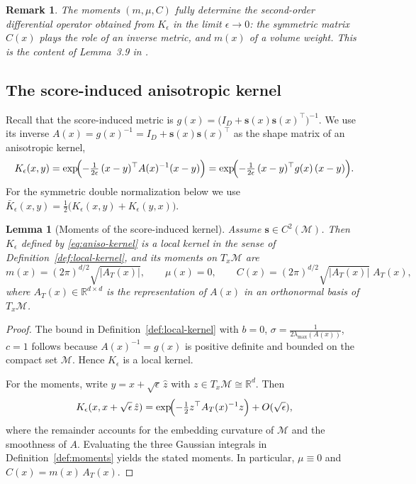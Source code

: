\documentclass{article}
\newcommand{\M}{\mathcal{M}}
\newtheorem{lemma}{Lemma}%
\newtheorem{remark}{Remark}
\begin{document}
\begin{remark}
The moments $(m,\mu,C)$ fully determine the second-order differential operator obtained from $K_\epsilon$ in the limit $\epsilon\to 0$: the symmetric matrix \(C(x)\) plays the role of an inverse metric, and \(m(x)\) of a volume weight. This is the content of Lemma~3.9 in \citep{berry2016local}.
\end{remark}

\subsection{The score-induced anisotropic kernel}

Recall that the score-induced metric is \(g(x)=\bigl(I_D+\mathbf{s}(x)\mathbf{s}(x)^\top\bigr)^{-1}\). We use its inverse \(A(x)=g(x)^{-1}=I_D+\mathbf{s}(x)\mathbf{s}(x)^\top\) as the shape matrix of an anisotropic kernel,
\begin{equation}\label{eq:aniso-kernel}
K_\epsilon(x,y)=\exp\!\Bigl(-\tfrac{1}{2\epsilon}\,(x-y)^\top A(x)^{-1}(x-y)\Bigr)
=\exp\!\Bigl(-\tfrac{1}{2\epsilon}\,(x-y)^\top g(x)\,(x-y)\Bigr).
\end{equation}
For the symmetric double normalization below we use \(\bar K_\epsilon(x,y)=\tfrac{1}{2}\bigl(K_\epsilon(x,y)+K_\epsilon(y,x)\bigr)\).

\begin{lemma}[Moments of the score-induced kernel]\label{lem:moments}
Assume \(\mathbf{s}\in C^2(\M)\). Then \(K_\epsilon\) defined by \eqref{eq:aniso-kernel} is a local kernel in the sense of Definition~\ref{def:local-kernel}, and its moments on \(T_x\M\) are
\[
m(x)=(2\pi)^{d/2}\sqrt{|A_T(x)|},
\qquad
\mu(x)=0,
\qquad
C(x)=(2\pi)^{d/2}\sqrt{|A_T(x)|}\;A_T(x),
\]
where \(A_T(x)\in\mathbb{R}^{d\times d}\) is the representation of \(A(x)\) in an orthonormal basis of \(T_x\M\).
\end{lemma}

\begin{proof}
The bound in Definition~\ref{def:local-kernel} with \(b = 0\), \(\sigma=\tfrac{1}{2\lambda_{\max}(A(x))}\), \(c=1\) follows because \(A(x)^{-1}=g(x)\) is positive definite and bounded on the compact set \(\M\). Hence \(K_\epsilon\) is a local kernel.

For the moments, write \(y=x+\sqrt\epsilon\,\hat z\) with \(z\in T_x\M\cong\mathbb{R}^d\). Then
\[
K_\epsilon(x,x+\sqrt\epsilon\,\hat z)
=\exp\!\Bigl(-\tfrac{1}{2}z^\top A_T(x)^{-1}z\Bigr)+O(\sqrt\epsilon),
\]
where the remainder accounts for the embedding curvature of \(\M\) and the smoothness of \(A\). Evaluating the three Gaussian integrals in Definition~\ref{def:moments} yields the stated moments. In particular, \(\mu\equiv 0\) and \(C(x)=m(x)\,A_T(x)\).
\end{proof}
\end{document}
